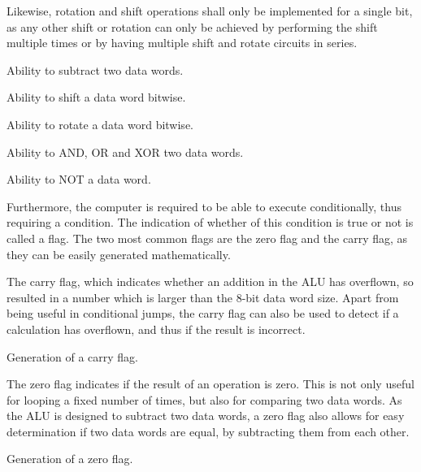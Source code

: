 Likewise, rotation and shift operations shall only be implemented for a single bit, as any other shift or rotation can only be achieved by performing the shift multiple times or by having multiple shift and rotate circuits in series.
\begin{feat-requirement} \label{req:sub}
  Ability to subtract two data words.
\end{feat-requirement}

\begin{feat-requirement}
  Ability to shift a data word bitwise.
\end{feat-requirement}

\begin{feat-requirement}
  Ability to rotate a data word bitwise.
\end{feat-requirement}

\begin{feat-requirement}
  Ability to AND, OR and XOR two data words.
\end{feat-requirement}

\begin{feat-requirement} \label{req:not}
  Ability to NOT a data word.
\end{feat-requirement}

Furthermore, the computer is required to be able to execute conditionally, thus requiring a condition. The indication of whether of this condition is true or not is called a flag. The two most common flags are the zero flag and the carry flag, as they can be easily generated mathematically. 

The carry flag, which indicates whether an addition in the ALU has overflown, so resulted in a number which is larger than the 8-bit data word size. Apart from being useful in conditional jumps, the carry flag can also be used to detect if a calculation has overflown, and thus if the result is incorrect.

\begin{turing-requirement}
  Generation of a carry flag. 
\end{turing-requirement}

The zero flag indicates if the result of an operation is zero. This is not only useful for looping a fixed number of times, but also for comparing two data words. As the ALU is designed to subtract two data words, a zero flag also allows for easy determination if two data words are equal, by subtracting them from each other. 

\begin{feat-requirement}
  Generation of a zero flag.
\end{feat-requirement}

